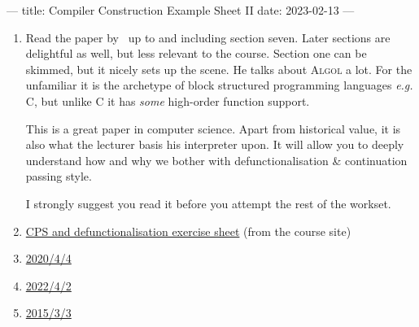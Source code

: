 ---
title: Compiler Construction Example Sheet II
date: 2023-02-13
---



\begin{enumerate}
  \item Read the paper by~\citet{reynolds1972definitional} up to and including
    section seven. Later sections are delightful as well, but less relevant to
    the course. Section one can be skimmed, but it nicely sets up the scene. He
    talks about \textsc{Algol} a lot. For the unfamiliar it is the archetype of
    block structured programming languages \emph{e.g.} \textsc{C}, but unlike
    \textsc{C} it has \emph{some} high-order function support.

    This is a great paper in computer science. Apart from historical value, it
    is also what the lecturer basis his interpreter upon. It will allow you to
    deeply understand how and why we bother with defunctionalisation \&
    continuation passing style.

    I strongly suggest you read it before you attempt the rest of the workset.

  \item
    \href{https://www.cl.cam.ac.uk/teaching/2122/CompConstr/exercises_cps.ml}{CPS
    and defunctionalisation exercise sheet} (from the course site)

  \item \href{https://www.cl.cam.ac.uk/teaching/exams/pastpapers/y2020p4q4.pdf}{2020/4/4}

  \item \href{https://www.cl.cam.ac.uk/teaching/exams/pastpapers/y2022p4q2.pdf}{2022/4/2}

  \item \href{http://www.cl.cam.ac.uk/teaching/exams/pastpapers/y2015p3q3.pdf}{2015/3/3}
\end{enumerate}


